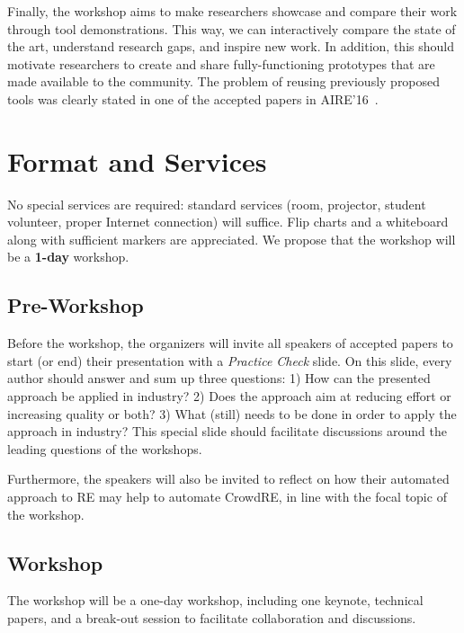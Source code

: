 \documentclass[conference,9pt]{IEEEtran}
\begin{document}
Finally, the workshop aims to make researchers showcase and compare their work through tool demonstrations. This way, we can interactively compare the state of the art, understand research gaps, and inspire new work. In addition, this should motivate researchers to create and share fully-functioning prototypes that are made available to the community. The problem of reusing previously proposed tools was clearly stated in one of the accepted papers in AIRE'16~\cite{arendse2016toward}.


\section{Format and Services}
No special services are required: standard services (room, projector, student volunteer, proper Internet connection) will suffice. Flip charts and a whiteboard along with sufficient markers are appreciated. We propose that the workshop will be a \textbf{1-day} workshop.

\subsection{Pre-Workshop}
Before the workshop, the organizers will invite all speakers of accepted papers to start (or end) their presentation with a \emph{Practice Check} slide. On this slide, every author should answer and sum up three questions: 1) How can the presented approach be applied in industry? 2) Does the approach aim at reducing effort or increasing quality or both? 3) What (still) needs to be done in order to apply the approach in industry? This special slide should facilitate discussions around the leading questions of the workshops.

Furthermore, the speakers will also be invited to reflect on how their automated approach to RE may help to automate CrowdRE, in line with the focal topic of the workshop.


\subsection{Workshop} The workshop will be a one-day workshop, including one keynote, technical papers, and a break-out session to facilitate collaboration and discussions.
\end{document}
